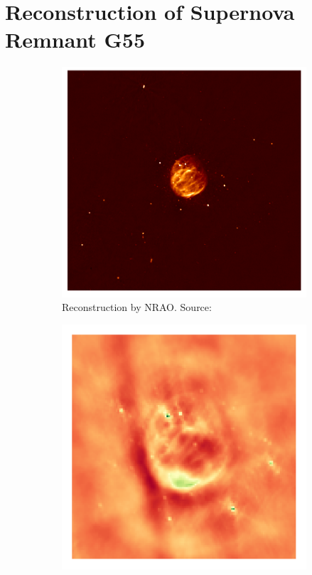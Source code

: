 \section{Reconstruction of Supernova Remnant G55}

\begin{figure}[h]
	\centering
	\begin{subfigure}[b]{0.45\linewidth}
		\includegraphics[width=\linewidth, trim={230px 210px 225px 200px}, clip]{./chapters/05.results/pic_G55_7.png}
		\caption{Reconstruction by NRAO.  Source:\cite{nraoG55}}
		\label{results:g55:nrao:rec}
	\end{subfigure}
	\begin{subfigure}[b]{0.45\linewidth}
		\includegraphics[width=\linewidth, trim={18px 19px 18px 18px}, clip]{./chapters/05.results/g55/raw_image.png}

\end{subfigure}
\end{figure}
